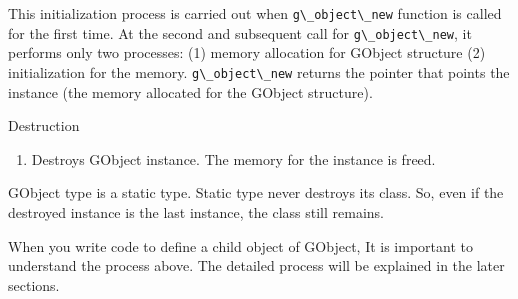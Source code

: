 This initialization process is carried out when
\passthrough{\lstinline!g\_object\_new!} function is called for the
first time. At the second and subsequent call for
\passthrough{\lstinline!g\_object\_new!}, it performs only two
processes: (1) memory allocation for GObject structure (2)
initialization for the memory. \passthrough{\lstinline!g\_object\_new!}
returns the pointer that points the instance (the memory allocated for
the GObject structure).

Destruction

\begin{enumerate}
\def\labelenumi{\arabic{enumi}.}
\tightlist
\item
  Destroys GObject instance. The memory for the instance is freed.
\end{enumerate}

GObject type is a static type. Static type never destroys its class. So,
even if the destroyed instance is the last instance, the class still
remains.

When you write code to define a child object of GObject, It is important
to understand the process above. The detailed process will be explained
in the later sections.
